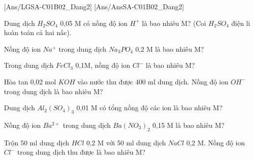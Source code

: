 [Ans/LGSA-C01B02_Dang2]
[Ans/AnsSA-C01B02_Dang2]
\begin{bt}
	Dung dịch $H_2SO_4$ 0,05 M có nồng độ ion $H^+$ là bao nhiêu M? (Coi $H_2SO_4$ điện li hoàn toàn cả hai nấc).
\end{bt}
\begin{bt}
	Nồng độ ion $Na^+$ trong dung dịch $Na_3PO_4$ 0,2 M là bao nhiêu M?
\end{bt}
\begin{bt}
    Trong dung dịch $FeCl_3$ 0,1M, nồng độ ion $Cl^-$ là bao nhiêu M?
\end{bt}
\begin{bt}
    Hòa tan 0,02 mol $KOH$ vào nước thu được 400 ml dung dịch. Nồng độ ion $OH^-$ trong dung dịch là bao nhiêu M?
\end{bt}
\begin{bt}
	Dung dịch $Al_2(SO_4)_3$ 0,01 M có tổng nồng độ các ion là bao nhiêu M?
\end{bt}
\begin{bt}
    Nồng độ ion $Ba^{2+}$ trong dung dịch $Ba(NO_3)_2$ 0,15 M là bao nhiêu M?
\end{bt}
\begin{bt}
    Trộn 50 ml dung dịch $HCl$ 0,2 M với 50 ml dung dịch $NaCl$ 0,2 M. Nồng độ ion $Cl^-$ trong dung dịch thu được là bao nhiêu M?
\end{bt}
